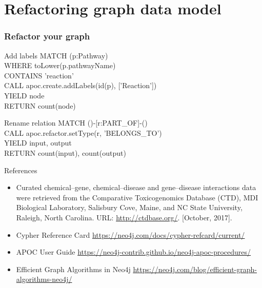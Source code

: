 \documentclass[12pt]{beamer}
\begin{document}
    \section{Refactoring graph data model}
    \begin{frame}
        \frametitle{Refactor your graph}
        \begin{block}{Add labels}
            MATCH (p:Pathway)\\
            \hspace{1cm} WHERE toLower(p.pathwayName)\\
            \hspace{1cm} CONTAINS 'reaction'\\
            CALL apoc.create.addLabels(id(p), ['Reaction'])\\
            \hspace{1cm} YIELD node\\
            RETURN count(node)
        \end{block}
        \begin{block}{Rename relation}
            MATCH ()-[r:PART\_OF]-()\\
            CALL apoc.refactor.setType(r, 'BELONGS\_TO')\\
            YIELD input, output\\
            RETURN count(input), count(output)\\
        \end{block}
    \end{frame}
    
    \begin{frame}{References}
        \begin{itemize}
            \item Curated chemical–gene, chemical–disease and gene–disease interactions data were retrieved from the Comparative Toxicogenomics Database (CTD), MDI Biological Laboratory, Salisbury Cove, Maine, and NC State University, Raleigh, North Carolina. URL: \textcolor{white}{\url{http://ctdbase.org/}}. [October, 2017].
            \item Cypher Reference Card \textcolor{white}{\url{https://neo4j.com/docs/cypher-refcard/current/}}
            \item APOC User Guide \textcolor{white}{\url{https://neo4j-contrib.github.io/neo4j-apoc-procedures/}}
            \item Efficient Graph Algorithms in Neo4j \textcolor{white}{\url{https://neo4j.com/blog/efficient-graph-algorithms-neo4j/}}
        \end{itemize}
    \end{frame}
    
\end{document}

